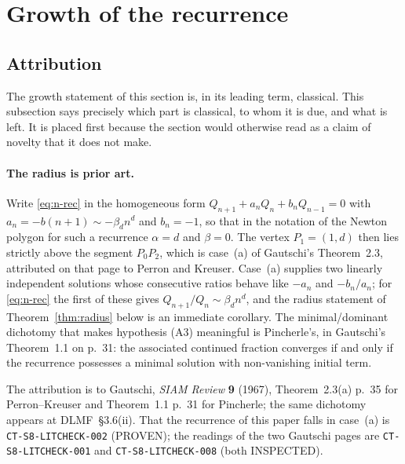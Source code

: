 %

\section{Growth of the recurrence}\label{sec:growth}

\subsection{Attribution}\label{ssec:attribution}

The growth statement of this section is, in its leading term, classical. This
subsection says precisely which part is classical, to whom it is due, and what
is left. It is placed first because the section would otherwise read as a claim
of novelty that it does not make.

\paragraph{The radius is prior art.} Write \eqref{eq:n-rec} in the homogeneous
form $Q_{n+1}+a_nQ_n+b_nQ_{n-1}=0$ with $a_n=-b(n+1)\sim-\beta_d n^{d}$ and
$b_n=-1$, so that in the notation of the Newton polygon for such a
recurrence $\alpha=d$ and $\beta=0$. The vertex $P_1=(1,d)$ then lies strictly
above the segment $P_0P_2$, which is case~(a) of Gautschi's Theorem~2.3,
attributed on that page to Perron and Kreuser. Case~(a) supplies two linearly
independent solutions whose consecutive ratios behave like $-a_n$ and
$-b_n/a_n$; for \eqref{eq:n-rec} the first of these gives
$Q_{n+1}/Q_n\sim\beta_d n^{d}$, and the radius statement of
Theorem~\ref{thm:radius} below is an immediate corollary. The minimal/dominant
dichotomy that makes hypothesis (A3) meaningful is Pincherle's, in Gautschi's
Theorem~1.1 on p.~31: the associated continued fraction converges if and only if
the recurrence possesses a minimal solution with non-vanishing initial term.

The attribution is to Gautschi, \emph{SIAM Review} \textbf{9} (1967),
Theorem~2.3(a) p.~35 for Perron--Kreuser and Theorem~1.1 p.~31 for Pincherle;
the same dichotomy appears at DLMF~\S3.6(ii). That the recurrence of this paper
falls in case~(a) is \texttt{CT-S8-LITCHECK-002} (PROVEN); the readings of the
two Gautschi pages are \texttt{CT-S8-LITCHECK-001} and
\texttt{CT-S8-LITCHECK-008} (both INSPECTED).

